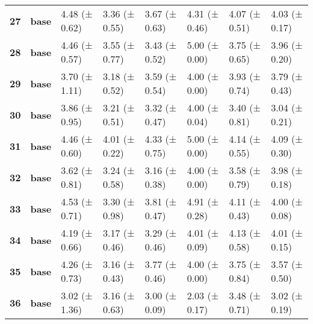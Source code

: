 \begin{longtable}{llllllll}
\cline{1-8}
\textbf{27} & \textbf{base} & 4.48 (± 0.62) & 3.36 (± 0.55) & 3.67 (± 0.63) & 4.31 (± 0.46) & 4.07 (± 0.51) & 4.03 (± 0.17) \\
\cline{1-8}
\textbf{28} & \textbf{base} & 4.46 (± 0.57) & 3.55 (± 0.77) & 3.43 (± 0.52) & 5.00 (± 0.00) & 3.75 (± 0.65) & 3.96 (± 0.20) \\
\cline{1-8}
\textbf{29} & \textbf{base} & 3.70 (± 1.11) & 3.18 (± 0.52) & 3.59 (± 0.54) & 4.00 (± 0.00) & 3.93 (± 0.74) & 3.79 (± 0.43) \\
\cline{1-8}
\textbf{30} & \textbf{base} & 3.86 (± 0.95) & 3.21 (± 0.51) & 3.32 (± 0.47) & 4.00 (± 0.04) & 3.40 (± 0.81) & 3.04 (± 0.21) \\
\cline{1-8}
\textbf{31} & \textbf{base} & 4.46 (± 0.60) & 4.01 (± 0.22) & 4.33 (± 0.75) & 5.00 (± 0.00) & 4.14 (± 0.55) & 4.09 (± 0.30) \\
\cline{1-8}
\textbf{32} & \textbf{base} & 3.62 (± 0.81) & 3.24 (± 0.58) & 3.16 (± 0.38) & 4.00 (± 0.00) & 3.58 (± 0.79) & 3.98 (± 0.18) \\
\cline{1-8}
\textbf{33} & \textbf{base} & 4.53 (± 0.71) & 3.30 (± 0.98) & 3.81 (± 0.47) & 4.91 (± 0.28) & 4.11 (± 0.43) & 4.00 (± 0.08) \\
\cline{1-8}
\textbf{34} & \textbf{base} & 4.19 (± 0.66) & 3.17 (± 0.46) & 3.29 (± 0.46) & 4.01 (± 0.09) & 4.13 (± 0.58) & 4.01 (± 0.15) \\
\cline{1-8}
\textbf{35} & \textbf{base} & 4.26 (± 0.73) & 3.16 (± 0.43) & 3.77 (± 0.46) & 4.00 (± 0.00) & 3.75 (± 0.84) & 3.57 (± 0.50) \\
\cline{1-8}
\textbf{36} & \textbf{base} & 3.02 (± 1.36) & 3.16 (± 0.63) & 3.00 (± 0.09) & 2.03 (± 0.17) & 3.48 (± 0.71) & 3.02 (± 0.19) \\
\cline{1-8}
\end{longtable}
